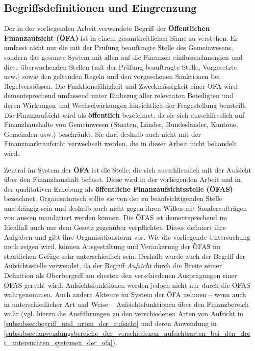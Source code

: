 \documentclass[10pt]{article}
\begin{document}
\subsection{Begriffsdefinitionen und Eingrenzung}\label{subsec:begriffsdefinitionen_und_eingrenzung}
Der in der vorliegenden Arbeit verwendete Begriff der \textbf{Öffentlichen Finanzaufsicht (ÖFA)} ist in einem gesamtheitlichen Sinne zu verstehen. Er umfasst nicht nur die mit der Prüfung beauftragte Stelle des Gemeinwesens, sondern das gesamte System mit allen auf die Finanzen einflussnehmenden und diese überwachenden Stellen (mit der Prüfung beauftragte Stelle, Vorgesetzte usw.) sowie den geltenden Regeln und den vorgesehenen Sanktionen bei Regelverstössen. Die Funktionsfähigkeit und Zweckmässigkeit einer ÖFA wird dementsprechend umfassend unter Einbezug aller relevanten Beteiligten und deren Wirkungen und Wechselwirkungen hinsichtlich der Fragestellung beurteilt. Die Finanzaufsicht wird als \textbf{öffentlich} bezeichnet, da sie sich ausschliesslich auf Finanzhaushalte von Gemeinwesen (Staaten, Länder, Bundesländer, Kantone, Gemeinden usw.) beschränkt. Sie darf deshalb auch nicht mit der Finanzmarktaufsicht verwechselt werden, die in dieser Arbeit nicht behandelt wird.

Zentral im System der \textbf{ÖFA} ist die Stelle, die sich ausschliesslich mit der Aufsicht über den Finanzhaushalt befasst. Diese wird in der vorliegenden Arbeit und in der qualitativen Erhebung als \textbf{öffentliche Finanzaufsichtsstelle (ÖFAS)} bezeichnet. Organisatorisch sollte sie von der zu beaufsichtigenden Stelle unabhängig sein und deshalb auch nicht gegen ihren Willen mit Sonderaufträgen von aussen mandatiert werden können. Die ÖFAS ist dementsprechend im Idealfall auch nur dem Gesetz gegenüber verpflichtet. Dieses definiert ihre Aufgaben und gibt ihre Organisationsform vor. Wie die vorliegende Untersuchung noch zeigen wird, können Ausgestaltung und Verankerung der ÖFAS im staatlichen Gefüge sehr unterschiedlich sein. Deshalb wurde auch der Begriff der Aufsichtsstelle verwendet, da der Begriff \textit{Aufsicht} durch die Breite seiner Definition als Oberbergriff am ehesten den verschiedenen Ausprägungen einer ÖFAS gerecht wird. Aufsichtsfunktionen werden jedoch nicht nur durch die ÖFAS wahrgenommen. Auch andere Akteure im System der ÖFA nehmen -- wenn auch in unterschiedlicher Art und Weise -- Aufsichtsfunktionen über den Finanzbereich wahr (vgl. hierzu die Ausführungen zu den verschiedenen Arten von Aufsicht in \vref{subsubsec:begriff_und_arten_der_aufsicht} und deren Anwendung in \vref{subsubsec:anwendungsbereiche_der_verschiedenen_aufsichtsarten_bei_den_drei_untersuchten_systemen_der_ofa}).
\end{document}
